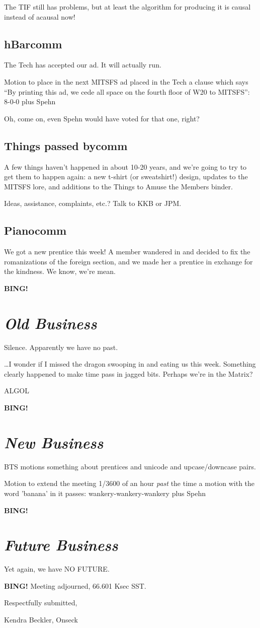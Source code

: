 \documentclass[10pt]{article}
\newcommand{\bing}{{\bf BING!} }
\newcommand{\goto}[1]{\bing \vskip 12pt \section*{{\em{#1}}}}
\newcommand{\ps}{ plus Spehn\xspace}
\newcommand{\onseck}{Kendra Beckler, Onseck}
\begin{document}
The TIF still has problems, but at least the algorithm for producing it is causal instead of acausal now!

\subsection*{hBarcomm}

The Tech has accepted our ad.  It will actually run.

Motion to place in the next MITSFS ad placed in the Tech a clause which says ``By printing this ad, we cede all space on the fourth floor of W20 to MITSFS'': 8-0-0 \ps

Oh, come on, even Spehn would have voted for that one, right?

\subsection*{Things passed bycomm}

A few things haven't happened in about 10-20 years, and we're going to try to get them to happen again: a new t-shirt (or sweatshirt!) design, updates to the MITSFS lore, and additions to the Things to Amuse the Members binder.

Ideas, assistance, complaints, etc.?  Talk to KKB or JPM.

\subsection*{Pianocomm}

We got a new prentice this week!  A member wandered in and decided to fix the romanizations of the foreign section, and we made her a prentice in exchange for the kindness.  We know, we're mean.

\goto{Old Business}

Silence.  Apparently we have no past.

\ldots  I wonder if I missed the dragon swooping in and eating us this week.  Something clearly happened to make time pass in jagged bits.  Perhaps we're in the Matrix?

ALGOL

\goto{New Business}

BTS motions something about prentices and unicode and upcase/downcase pairs.

Motion to extend the meeting 1/3600 of an hour \textit{past} the time a motion with the word 'banana' in it passes: wankery-wankery-wankery \ps

\goto{Future Business}

Yet again, we have NO FUTURE.

\bing
\noindent
Meeting adjourned, 66.601 Ksec SST.

\vspace{18pt}

\centerline{Respectfully submitted,}
\centerline{\onseck}
\end{document}

